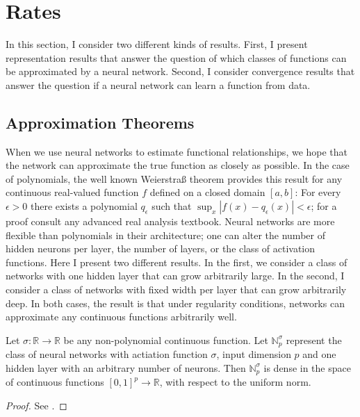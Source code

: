\section{Rates}
\label{seq:rates}

In this section, I consider two different kinds of results. First, I present
representation results that answer the question of which classes of functions can be
approximated by a neural network. Second, I consider convergence results that answer
the question if a neural network can learn a function from data.

\subsection{Approximation Theorems}

When we use neural networks to estimate functional relationships, we hope that the
network can approximate the true function as closely as possible. In the case of
polynomials, the well known Weierstra{\ss} theorem provides this result for any
continuous real-valued function $f$ defined on a closed domain $[a, b]$: For every
$\epsilon > 0$ there exists a polynomial $q_\epsilon$ such that $\sup_{x} |f(x) -
q_\epsilon(x)| < \epsilon$; for a proof consult any advanced real analysis textbook.
Neural networks are more flexible than polynomials in their architecture; one can alter
the number of hidden neurons per layer, the number of layers, or the class of activation
functions. Here I present two different results. In the first, we consider a class of
networks with one hidden layer that can grow arbitrarily large. In the second, I
consider a class of networks with fixed width per layer that can grow arbitrarily deep.
In both cases, the result is that under regularity conditions, networks can approximate
any continuous functions arbitrarily well.

\begin{theorem}
   Let $\sigma : \mathbb{R} \to \mathbb{R}$ be any non-polynomial continuous function.
   Let $\mathbb{N}_p^\sigma$ represent the class of neural networks with actiation
   function $\sigma$, input dimension $p$ and one hidden layer with an arbitrary number
   of neurons. Then $\mathbb{N}_p^\sigma$ is dense in the space of continuous functions
   $[0, 1]^p \to \mathbb{R}$, with respect to the uniform norm.
\end{theorem}
\begin{proof}
    See \cite{Cybenko.1989,Hornik.1991,Pinkus.1999}.
\end{proof}

